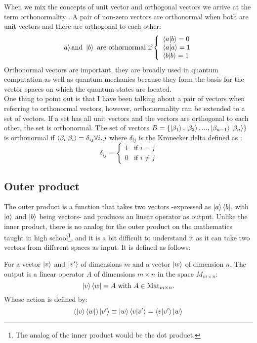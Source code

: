 When we mix the concepts of unit vector and orthogonal vectors we arrive at the term orthonormality \cite{QCandQI:GramSchmidt}. A pair of non-zero vectors are orthonormal when both are unit vectors and there are orthogonal to each other: 
$$
\ket{a} \text{and } \ket{b} \text{ are othornormal if} \left\{
	\begin{array}{ll}
		\bra{a}\ket{b} = 0 \\
		\bra{a}\ket{a} = 1 \\
		\bra{b}\ket{b} = 1 \\
	\end{array}
\right.
$$
Orthonormal vectors are important, they are broadly used in quantum computation as well as quantum mechanics because they form the basis for the vector spaces on which the quantum states are located.  \\
One thing to point out is that I have been talking about a pair of vectors when referring to orthonormal vectors, however, orthonormality can be extended to a set of vectors. If a set has all unit vectors and the vectors are orthogonal to each other, the set is orthonormal. The set of vectors $ B = \{\ket{\beta_1}, \ket{\beta_2}, ..., \ket{\beta_{n-1}} \ket{\beta_n}\} $ is
orthonormal if $\bra{\beta_i}\ket{\beta_i} = \delta_{ij}  \forall i, j$ \cite{QCandQI:GramSchmidt} where $\delta_{ij}$ is the Kronecker delta defined as 
: 
$$
\delta_{ij} =
\begin{cases}
	1 & \text{if } i=j\\
	0 & \text{if } i\neq j
\end{cases}
$$

\subsection{Outer product}
The outer product is a function that takes two vectors -expressed as $\ket{a}\bra{b}$, with $\ket{a}$ and $\ket{b}$ being vectors- and produces an linear operator as output. Unlike the inner product, there is no analog for the outer product on the mathematics taught in high school\footnote{The analog of the inner product would be the dot product.}, and it is a bit difficult to understand it as it can take two vectors from different spaces as input. It is defined as follows:


For a vector $\ket{v}$ and $\ket{v'}$ of dimensions $m$ and a vector $\ket{w}$ of dimension $n$. The output is a linear operator $A$ of dimensions $m \times n$ in the space $M_{m\times n}$:
$$
\ket{v}\bra{w} = A \text{ with } A\in \mathrm{Mat}_{m\times n} .
$$ 
Whose action is defined by: 
\begin{equation}
	(\ket{v}\bra{w})\ket{v'} \equiv \ket{w}\bra{v}\ket{v'} = \bra{v}\ket{v'}\ket{w}
	\label{eq:outer_def}
\end{equation}


